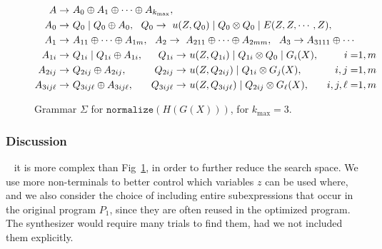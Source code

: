 \begin{figure}
\begin{alignat*}{3}
A \rightarrow \ & \parbox{15mm}{\mbox{$A_0 \oplus A_1 \oplus \cdots \oplus A_{k_{\max}},$}} \\
A_0 \rightarrow \ & \parbox{15mm}{\mbox{$Q_0 \mid Q_0 \oplus A_0,\ \ Q_0 \rightarrow \ u(Z,Q_0) \mid Q_0 \otimes Q_0 \mid E(Z,Z,\cdots, Z),$}}\\
A_1\rightarrow \ & \parbox{15mm}{\mbox{$A_{11} \oplus \cdots \oplus A_{1m},\ \ A_2\rightarrow  \  A_{211} \oplus \cdots \oplus A_{2mm}, \ \ A_3 \rightarrow A_{3111}\oplus \cdots$}}\\
A_{1i} \rightarrow \ & Q_{1i} \mid Q_{1i} \oplus A_{1i}, & Q_{1i} \rightarrow \ & u(Z,Q_{1i}) \mid Q_{1i} \otimes Q_0 \mid G_i(X), &i=&1,m\\
A_{2ij} \rightarrow \ & Q_{2ij} \oplus A_{2ij}, & Q_{2ij} \rightarrow \ & u(Z,Q_{2ij}) \mid Q_{1i} \otimes G_j(X), &i,j=&1,m\\
A_{3ij\ell} \rightarrow \ & Q_{3ij\ell} \oplus A_{3ij\ell}, &Q_{3ij\ell} \rightarrow \ & u(Z,Q_{3ij\ell}) \mid Q_{2ij} \otimes G_\ell(X), &i,j,\ell=&1,m
  \end{alignat*}
\caption{Grammar $\Sigma$ for $\texttt{normalize}(H(G(X)))$, for $k_{\max}=3$.}
  \label{fig:grammar}
\end{figure}




\subsubsection{Discussion}\label{sec:grammar}\  it is more complex than
Fig~\ref{fig:grammar}, in order to further reduce the search space.
We use more non-terminals to better control which variables $z$ can be
used where, and we also consider the choice of including entire
subexpressions that occur in the original program $P_1$, since they
are often reused in the optimized program. The synthesizer would
require many trials to find them, had we not included them explicitly.


